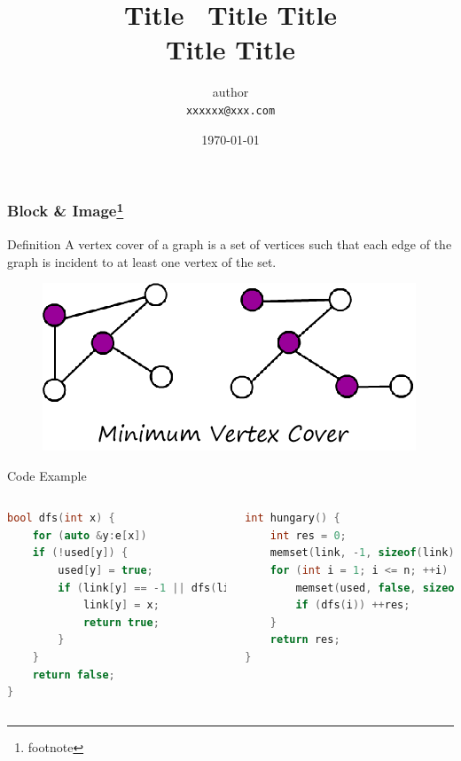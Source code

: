 


\title{Title \ Title Title \\ Title Title}
\author{author\\ \texttt{xxxxxx@xxx.com}}
\date{ \today}

\frame[plain]\titlepage

\begin{frame}[containsverbatim]\frametitle{\LARGE Block \& Image\footnote{footnote}}
\begin{block}{Definition}
A vertex cover of a graph is a set of vertices such that each edge of the graph is incident to at least one vertex of the set.
\end{block}

\begin{figure}[h!]
\centering
\includegraphics[scale=0.6]{assets/example.png}	%
\end{figure}
\end{frame}


\begin{frame}[containsverbatim]{\LARGE Code Example}
\begin{columns}[c]
\begin{lstlisting}[language=C++,aboveskip=0pt,basicstyle=\linespread{1.1}\small\ttfamily]
bool dfs(int x) {
	for (auto &y:e[x])
	if (!used[y]) {
		used[y] = true;
		if (link[y] == -1 || dfs(link[y])) {
			link[y] = x;
			return true;
		}
	}
	return false;
}
\end{lstlisting}
\begin{lstlisting}[language=C++,aboveskip=0pt,basicstyle=\linespread{1.1}\small\ttfamily]
int hungary() {
	int res = 0;
	memset(link, -1, sizeof(link));
	for (int i = 1; i <= n; ++i) {
		memset(used, false, sizeof(used));
		if (dfs(i)) ++res;
	}
	return res;
}
\end{lstlisting}
\end{columns}
\end{frame}


